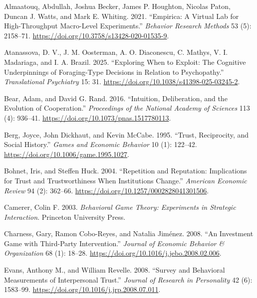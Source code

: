 \documentclass[
]{article}
\newlength{\cslhangindent}
\newenvironment{CSLReferences}[2] %
 {\begin{list}{}{%
  \setlength{\itemindent}{0pt}
  \setlength{\leftmargin}{0pt}
  \setlength{\parsep}{0pt}
  \ifodd #1
   \setlength{\leftmargin}{\cslhangindent}
   \setlength{\itemindent}{-1\cslhangindent}
  \fi
  \setlength{\itemsep}{#2\baselineskip}}}
 {\end{list}}
\begin{document}
\protect{}\label{refs}
\begin{CSLReferences}{1}{1}
Almaatouq, Abdullah, Joshua Becker, James P. Houghton, Nicolas Paton, Duncan J. Watts, and Mark E. Whiting. 2021. {``{Empirica}: A Virtual Lab for High-Throughput Macro-Level Experiments.''} \emph{Behavior Research Methods} 53 (5): 2158--71. \url{https://doi.org/10.3758/s13428-020-01535-9}.

Atanassova, D. V., J. M. Oosterman, A. O. Diaconescu, C. Mathys, V. I. Madariaga, and I. A. Brazil. 2025. {``Exploring When to Exploit: The Cognitive Underpinnings of Foraging-Type Decisions in Relation to Psychopathy.''} \emph{Translational Psychiatry} 15: 31. \url{https://doi.org/10.1038/s41398-025-03245-2}.

Bear, Adam, and David G. Rand. 2016. {``Intuition, Deliberation, and the Evolution of Cooperation.''} \emph{Proceedings of the National Academy of Sciences} 113 (4): 936--41. \url{https://doi.org/10.1073/pnas.1517780113}.

Berg, Joyce, John Dickhaut, and Kevin McCabe. 1995. {``Trust, Reciprocity, and Social History.''} \emph{Games and Economic Behavior} 10 (1): 122--42. \url{https://doi.org/10.1006/game.1995.1027}.

Bohnet, Iris, and Steffen Huck. 2004. {``Repetition and Reputation: {Implications} for Trust and Trustworthiness When Institutions Change.''} \emph{American Economic Review} 94 (2): 362--66. \url{https://doi.org/10.1257/0002828041301506}.

Camerer, Colin F. 2003. \emph{Behavioral Game Theory: {Experiments} in Strategic Interaction}. Princeton University Press.

Charness, Gary, Ramon Cobo-Reyes, and Natalia Jiménez. 2008. {``An Investment Game with Third-Party Intervention.''} \emph{Journal of Economic Behavior \& Organization} 68 (1): 18--28. \url{https://doi.org/10.1016/j.jebo.2008.02.006}.

Evans, Anthony M., and William Revelle. 2008. {``Survey and Behavioral Measurements of Interpersonal Trust.''} \emph{Journal of Research in Personality} 42 (6): 1583--99. \url{https://doi.org/10.1016/j.jrp.2008.07.011}.


\end{CSLReferences}
\end{document}
